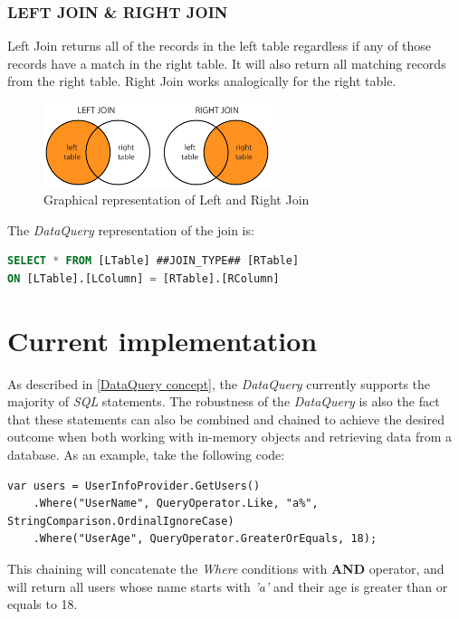 \documentclass[
  print,
  table,
  nolof,
  nolot,
  nocover,
  oneside
]{fithesis3}
\begin{document}
\subsubsection{LEFT JOIN \& RIGHT JOIN}
Left Join returns all of the records in the left table regardless if any of those records have a match in the right table. It will also return all matching records from the right table. Right Join works analogically for the right table\parencite{venn_diagrams}.
\begin{figure}[!ht]
  \centering
  \begin{minipage}{\textwidth}
    \begin{center}
      \includegraphics[width=0.6\textwidth]{img/sql-left-right-join.png}
    \end{center}
  \end{minipage}
  \caption{Graphical representation of Left and Right Join}
  \label{lef_right_join}
\end{figure}

The \textit{DataQuery} representation of the join is:
\begin{lstlisting}[language=SQL,escapechar=@,language=SQL,basicstyle=\ttfamily]
SELECT * FROM [LTable] ##JOIN_TYPE## [RTable]
ON [LTable].[LColumn] = [RTable].[RColumn]
\end{lstlisting}


\section{Current implementation}
\label{current implementation}

As described in \autoref{DataQuery concept}, the \textit{DataQuery} currently supports the majority of \textit{SQL} statements. The robustness of the \textit{DataQuery} is also the fact that these statements can also be combined and chained to achieve the desired outcome when both working with in-memory objects and retrieving data from a database. As an example, take the following code:
\begin{lstlisting}
var users = UserInfoProvider.GetUsers()
    .Where("UserName", QueryOperator.Like, "a%", StringComparison.OrdinalIgnoreCase)
    .Where("UserAge", QueryOperator.GreaterOrEquals, 18);
\end{lstlisting}
This chaining will concatenate the \textit{Where} conditions with \textbf{AND} operator, and will return all users whose name starts with \textit{'a'} and their age is greater than or equals to 18.
\end{document}
